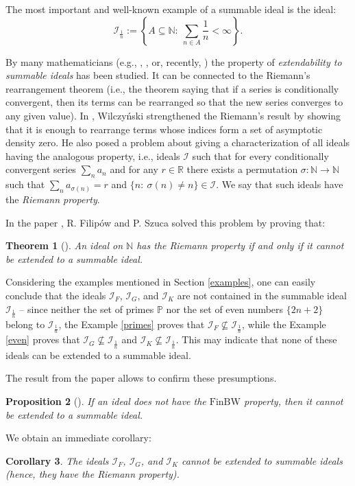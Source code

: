 \documentclass{amsart}
\newtheorem{thm}{Theorem}[section]
\newtheorem{prop}[thm]{Proposition}
\newtheorem{cor}[thm]{Corollary}
\theoremstyle{definition}
\newcommand{\N}{{\mathbb N}}
\newcommand{\R}{{\mathbb R}}
\newcommand{\I}{\mathcal I}
\newcommand{\finbw}{\text{FinBW}}
\begin{document}
The most important and well-known example of a summable ideal is the ideal:  
$$\I_{\frac{1}{n}} := \left\{A\subseteq \N :\ \sum_{n\in A}{\frac{1}{n}} <\infty\right\}.$$

By many mathematicians (e.g., \cite{Au}, \cite{FreedSem}, or, recently, \cite{Klinga}) the property of \emph{extendability to summable ideals} has been studied. It can be connected to the Riemann's rearrangement theorem (i.e., the theorem saying that if a series is conditionally convergent, then its terms can be rearranged so that the new series converges to any given value). In \cite{W}, Wilczy\'nski strengthened the Riemann's result by showing that it is enough to rearrange terms whose indices form a set of asymptotic density zero. He also posed a problem about giving a characterization of all ideals having the analogous property, i.e., ideals $\I$ such that for every conditionally convergent series $\sum_n{a_n}$ and for any $r\in\R$ there exists a permutation $\sigma \colon \N\to\N$ such that $\sum_n{a_{\sigma(n)}} = r$ and $\{n :\ \sigma(n)\neq n\}\in\I$. We say that such ideals have the \emph{Riemann property}.

In the paper \cite{H3}, R. Filip\'ow and P. Szuca solved this problem by proving that:
\begin{thm}[{\cite[Theorem 3.3]{H3}}]
An ideal on $\N$ has the Riemann property if and only if it cannot be extended to a summable ideal.
\end{thm}

Considering the examples mentioned in Section \ref{examples}, one can easily conclude that the ideals $\I_F$, $\I_G$, and $\I_K$ are not contained in the summable ideal $\I_{\frac{1}{n}}$ -- since neither the set of primes $\mathbb{P}$ nor the set of even numbers $\{2n+2\}$ belong to $\I_{\frac{1}{n}}$, the Example \ref{primes} proves that $\I_F \not\subseteq \I_{\frac{1}{n}}$, while the Example \ref{even} proves that $\I_G \not\subseteq \I_{\frac{1}{n}}$ and $\I_K \not\subseteq \I_{\frac{1}{n}}$.
This may indicate that none of these ideals can be extended to a summable ideal.

The result from the paper \cite{H3} allows to confirm these presumptions.

\begin{prop}[{\cite[Corollary 3.5]{H3}}]
If an ideal does not have the $\finbw$ property, then it cannot be extended to a summable ideal.
\end{prop}

We obtain an immediate corollary:
\begin{cor}
The ideals $\I_F$, $\I_G$, and $\I_K$ cannot be extended to summable ideals (hence, they have the Riemann property).
\end{cor}
\end{document}
